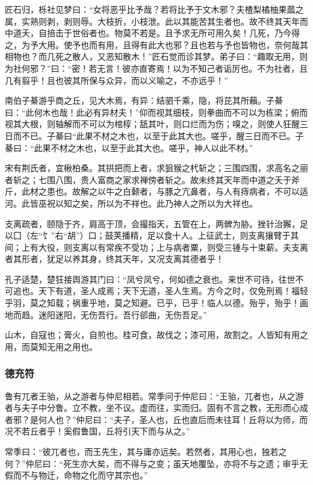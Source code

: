 \documentclass[]{article}
\begin{document}
匠石归，栎社见梦曰：``女将恶乎比予哉？若将比予于文木邪？夫楂梨橘柚果蓏之属，实熟则剥，剥则辱。大枝折，小枝泄。此以其能苦其生者也。故不终其天年而中道夭，自掊击于世俗者也。物莫不若是。且予求无所可用久矣！几死，乃今得之，为予大用。使予也而有用，且得有此大也邪？且也若与予也皆物也，奈何哉其相物也？而几死之散人，又恶知散木！''匠石觉而诊其梦。弟子曰：``趣取无用，则为社何邪？''曰：``密！若无言！彼亦直寄焉！以为不知己者诟厉也。不为社者，且几有翦乎！且也彼其所保与众异，而以义喻之，不亦远乎！''

南伯子綦游乎商之丘，见大木焉，有异：结驷千乘，隐，将芘其所藾。子綦曰：``此何木也哉！此必有异材夫！''仰而视其细枝，则拳曲而不可以为栋梁；俯而视其大根，则轴解而不可以为棺椁；舐其叶，则口烂而为伤；嗅之，则使人狂醒三日而不已。子綦曰``此果不材之木也，以至于此其大也。嗟乎，醒三日而不已。子綦曰：``此果不材之木也，以至于此其大也。嗟乎，神人以此不材。''

宋有荆氏者，宜楸柏桑。其拱把而上者，求狙猴之杙斩之；三围四围，求高名之丽者斩之；七围八围，贵人富商之家求禅傍者斩之。故未终其天年而中道之夭于斧斤，此材之患也。故解之以牛之白颡者，与豚之亢鼻者，与人有痔病者，不可以适河。此皆巫祝以知之矣，所以为不祥也。此乃神人之所以为大祥也。

支离疏者，颐隐于齐，肩高于顶，会撮指天，五管在上，两髀为胁。挫针治獬，足以囗（左``饣''右``胡''）口；鼓荚播精，足以食十人。上征武士，则支离攘臂于其间；上有大役，则支离以有常疾不受功；上与病者粟，则受三锺与十束薪。夫支离者其形者，犹足以养其身，终其天年，又况支离其德者乎！

孔子适楚，楚狂接舆游其门曰：``凤兮凤兮，何如德之衰也。来世不可待，往世不可追也。天下有道，圣人成焉；天下无道，圣人生焉。方今之时，仅免刑焉！福轻乎羽，莫之知载；祸重乎地，莫之知避。已乎，已乎！临人以德。殆乎，殆乎！画地而趋。迷阳迷阳，无伤吾行。吾行郤曲，无伤吾足。''

山木，自寇也；膏火，自煎也。桂可食，故伐之；漆可用，故割之。人皆知有用之用，而莫知无用之用也。

\hypertarget{header-n123}{%
\subsubsection{德充符}\label{header-n123}}

鲁有兀者王骀，从之游者与仲尼相若。常季问于仲尼曰：``王骀，兀者也，从之游者与夫子中分鲁。立不教，坐不议。虚而往，实而归。固有不言之教，无形而心成者邪？是何人也？''仲尼曰：``夫子，圣人也，丘也直后而未往耳！丘将以为师，而况不若丘者乎！奚假鲁国，丘将引天下而与从之。''

常季曰：``彼兀者也，而王先生，其与庸亦远矣。若然者，其用心也，独若之何？''仲尼曰：``死生亦大矣，而不得与之变；虽天地覆坠，亦将不与之遗；审乎无假而不与物迁，命物之化而守其宗也。''
\end{document}
